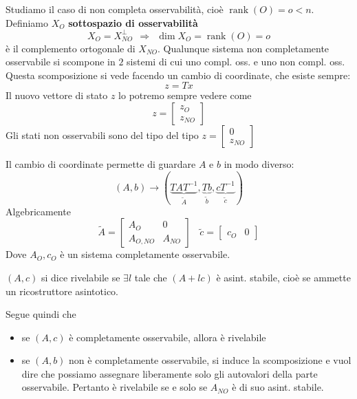 \documentclass[10pt,a4paper]{book}
\DeclareMathOperator{\rank}{rank}
\begin{document}
Studiamo il caso di non completa osservabilità, cioè $\rank(O) =o< n$. Definiamo $X_O$ \textbf{sottospazio di osservabilità}
\begin{equation*}
	X_O =X^{\perp }_{NO} \ \ \Rightarrow \ \ \dim X_O =\rank(O) =o
\end{equation*}
è il complemento ortogonale di $X_{NO}$. Qualunque sistema non completamente osservabile si scompone in $2$ sistemi di cui uno compl. oss. e uno non compl. oss. Questa scomposizione si vede facendo un cambio di coordinate, che esiste sempre:
\begin{equation*}
	z=Tx
\end{equation*}
Il nuovo vettore di stato $z$ lo potremo sempre vedere come
\begin{equation*}
	z=\begin{bmatrix}
	z_O\\
	z_{NO}
	\end{bmatrix}
\end{equation*}
Gli stati non osservabili sono del tipo del tipo $z=\begin{bmatrix}
0\\
z_{NO}
\end{bmatrix}$

Il cambio di coordinate permette di guardare $A$ e $b$ in modo diverso:
\begin{equation*}
	(A,b)\rightarrow \left(\underbrace{TAT^{-1}}_{\tilde{A}} ,\underbrace{Tb}_{\tilde{b}} ,\underbrace{cT^{-1}}_{\tilde{c}}\right)
\end{equation*}
Algebricamente
\begin{equation*}
	\tilde{A} =\begin{bmatrix}
	A_O & 0\\
	A_{O,NO} & A_{NO}
	\end{bmatrix} \ \ \ \ \tilde{c} =\begin{bmatrix}
	c_O & 0
	\end{bmatrix}
\end{equation*}
Dove $A_O ,c_O$ è un sistema completamente osservabile.
\begin{definition}
	$(A,c)$ si dice rivelabile se $\exists l$ tale che $(A+lc)$ è asint. stabile, cioè se ammette un ricostruttore asintotico.
\end{definition}
Segue quindi che
\begin{itemize}
	\item se $(A,c)$ è completamente osservabile, allora è rivelabile
	\item se $(A,b)$ non è completamente osservabile, si induce la scomposizione e vuol dire che possiamo assegnare liberamente solo gli autovalori della parte osservabile. Pertanto è rivelabile se e solo se $A_{NO}$ è di suo asint. stabile.
\end{itemize}
\end{document}
